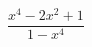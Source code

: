 \begin{ex}[type=expression]
	\begin{condition}
		\(\dfrac{x^4-2x^2+1}{1-x^4}\)
	\end{condition}
\end{ex}